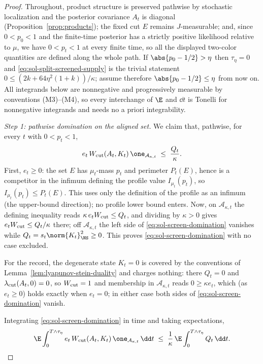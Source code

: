 \documentclass[../main.tex]{subfiles}
\begin{document}
\begin{proof}
Throughout, product structure is preserved pathwise by stochastic localization and the
posterior covariance $A_t$ is diagonal (Proposition~\ref{prop:products}); the fixed cut $E$
remains $J$-measurable; and, since $0<p_0<1$ and the finite-time posterior has a strictly
positive likelihood relative to $\mu$, we have $0<p_t<1$ at every finite time, so all the
displayed two-color quantities are defined along the whole path.  If
$\abs{p_0-1/2}>\eta$ then $\tau_\eta=0$ and \eqref{eq:sol-split-screened-supply} is the
trivial statement $0\le(2k+64\eta^2(1+k))/\kappa$; assume therefore
$\abs{p_0-1/2}\le\eta$ from now on.  All integrands below are nonnegative and progressively
measurable by conventions (M3)--(M4), so every interchange of $\E$ and $\dd t$ is Tonelli for
nonnegative integrands and needs no a priori integrability.

\medskip
\emph{Step 1: pathwise domination on the aligned set.}
We claim that, pathwise, for every $t$ with $0<p_t<1$,
\begin{equation}
\label{eq:sol-screen-domination}
  e_t\,W_{\rm cut}(A_t,K_t)\,\one_{\mathcal A_{\kappa,t}}
  \;\le\;\frac{Q_t}{\kappa}.
\end{equation}
First, $e_t\ge0$: the set $E$ has $\mu_t$-mass $p_t$ and perimeter $P_t(E)$, hence is a
competitor in the infimum defining the profile value $I_{\mu_t}(p_t)$, so
$I_{\mu_t}(p_t)\le P_t(E)$.  This uses only the definition of the profile as an infimum
(the upper-bound direction); no profile lower bound enters.  Now, on
$\mathcal A_{\kappa,t}$ the defining inequality reads
$\kappa\,e_tW_{\rm cut}\le Q_t$, and dividing by $\kappa>0$ gives
$e_tW_{\rm cut}\le Q_t/\kappa$ there; off $\mathcal A_{\kappa,t}$ the left side of
\eqref{eq:sol-screen-domination} vanishes while $Q_t=s_t\norm{K_t}_\HS^2\ge0$.  This proves
\eqref{eq:sol-screen-domination} with no case excluded.

For the record, the degenerate state $K_t=0$ is covered by the conventions of
Lemma~\ref{lem:lyapunov-stein-duality} and charges nothing: there $Q_t=0$ and
$\lambda_{\rm cut}(A_t,0)=0$, so $W_{\rm cut}=1$ and membership in
$\mathcal A_{\kappa,t}$ reads $0\ge\kappa e_t$, which (as $e_t\ge0$) holds exactly when
$e_t=0$; in either case both sides of \eqref{eq:sol-screen-domination} vanish.

Integrating \eqref{eq:sol-screen-domination} in time and taking expectations,
\begin{equation}
\label{eq:sol-step1}
  \E\int_0^{T\wedge\tau_\eta}
    e_t\,W_{\rm cut}(A_t,K_t)\,\one_{\mathcal A_{\kappa,t}}\,\dd t
  \;\le\;\frac1\kappa\,\E\int_0^{T\wedge\tau_\eta}Q_t\,\dd t .
\end{equation}


\end{proof}
\end{document}
